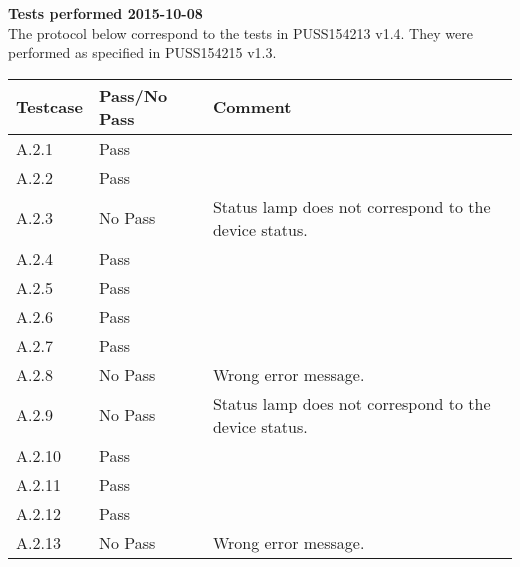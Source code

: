 \renewcommand{\testdate}{2015-10-08}
\textbf{Tests performed \testdate} \\
The protocol below correspond to the tests in PUSS154213 v1.4. They were performed as specified in PUSS154215 v1.3.
	\begin{center}
  		\begin{tabular}{| p{3cm} | p{5cm} | p{5cm} |}
    		\hline
	    	\textbf{Testcase}			& \textbf{Pass/No Pass} 	& \textbf{Comment} \\ \hline
    		A.2.1		 						& Pass 										&  				\\ \hline
    		A.2.2		 						& Pass 										& 				 \\	\hline
    		A.2.3		 						& No Pass 										& Status lamp does not correspond to the device status.				 \\	\hline
    		A.2.4		 						& Pass 										& 				 \\	\hline
    		A.2.5		 						& Pass 										& 				 \\	\hline
    		A.2.6		 						& Pass 										& 				 \\	\hline
    		A.2.7		 						& Pass 										& 				 \\	\hline
    		A.2.8		 						& No Pass 										& Wrong error message.				 \\	\hline
    		A.2.9		 						& No Pass 										& Status lamp does not correspond to the device status.				 \\	\hline
    		A.2.10	 							& Pass 										& 				 \\	\hline
    		A.2.11	 							& Pass 										& 				 \\	\hline
    		A.2.12	 							& Pass 										& 				 \\	\hline
    		A.2.13	 							& No Pass 											&  Wrong error message.				 \\	\hline
 		 \end{tabular}
	\end{center}